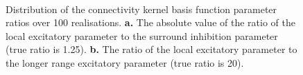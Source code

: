 \documentclass[twocolumn,11pt,a4paper]{article}		%
\begin{document}
\begin{figure}[th]
\\
\caption{Distribution of the connectivity kernel basis function parameter ratios over 100 realisations. \textbf{a.} The absolute value of the ratio of the local excitatory parameter to the surround inhibition parameter (true ratio is 1.25). \textbf{b.} The ratio of the local excitatory parameter to the longer range excitatory parameter (true ratio is 20).}
\end{figure}
\label{fig:ParametersRatio}
\end{document}
